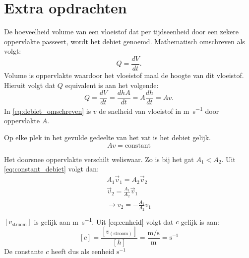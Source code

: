 \documentclass[numbers=endperiod]{scrartcl}
\begin{document}
\section{Extra opdrachten}
De hoeveelheid volume van een vloeistof dat per tijdseenheid door een zekere oppervlakte passeert, wordt het debiet genoemd. Mathematisch omschreven als volgt:
\begin{equation}\label{eq:debiet}
    Q = \frac{dV}{dt}.
\end{equation}
Volume is oppervlakte waardoor het vloeistof maal de hoogte van dit vloeistof. Hieruit volgt dat $Q$ equivalent is aan het volgende:
\begin{equation}\label{eq:debiet_omschreven}
    Q = \frac{dV}{dt} = \frac{dhA}{dt} = A\frac{dh}{dt} = Av.
\end{equation}
In \cref{eq:debiet_omschreven} is $v$ de snelheid van vloeistof in \si{\meter\per\second} door oppervlakte $A$.

Op elke plek in het gevulde gedeelte van het vat is het debiet gelijk. 
\begin{equation}\label{eq:constant_debiet}
    Av = \text{constant}
\end{equation}

Het doorsnee oppervlakte verschilt weliswaar. Zo is bij het gat $A_1 < A_2$. Uit \cref{eq:constant_debiet} volgt dan:
\begin{equation}\label{eq:v_h}
\begin{split}
    A_1\vec{v}_1 = A_2\vec{v}_2\\
    \vec{v}_2 = \frac{A_1}{A_2}\vec{v}_1\\
     \rightarrow v_2 = -\frac{A_1}{A_2}v_1\\
    \end{split}
    \end{equation}
$[v_{\text{stroom}}]$ is gelijk aan \si{\meter\per\second}. Uit \cref{eq:eenheid} volgt dat $c$ gelijk is aan:
\begin{equation}\label{eq:eenheid}
[c] = \frac{[v_{(\text{stroom})}]}{[h]} = \frac{\si{\meter\per\second}}{\si{\meter}} = \si{\second}^{-1}
\end{equation}
De constante $c$ heeft dus als eenheid $\si{\second}^{-1}$
\end{document}
